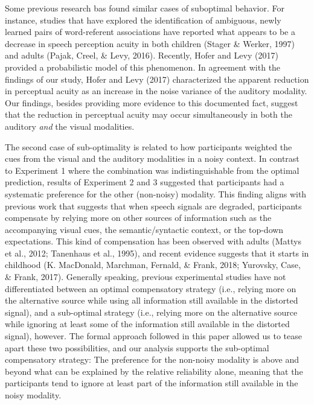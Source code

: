 \documentclass[english,,man,floatsintext]{apa6}
\theoremstyle{definition}
\theoremstyle{definition}
\theoremstyle{definition}
\theoremstyle{remark}
\begin{document}
Some previous research bas found similar cases of suboptimal behavior.
For instance, studies that have explored the identification of
ambiguous, newly learned pairs of word-referent associations have
reported what appears to be a decrease in speech perception acuity in
both children (Stager \& Werker, 1997) and adults (Pajak, Creel, \&
Levy, 2016). Recently, Hofer and Levy (2017) provided a probabilistic
model of this phenomenon. In agreement with the findings of our study,
Hofer and Levy (2017) characterized the apparent reduction in perceptual
acuity as an increase in the noise variance of the auditory modality.
Our findings, besides providing more evidence to this documented fact,
suggest that the reduction in perceptual acuity may occur simultaneously
in both the auditory \emph{and} the visual modalities.

The second case of sub-optimality is related to how participants
weighted the cues from the visual and the auditory modalities in a noisy
context. In contrast to Experiment 1 where the combination was
indistinguishable from the optimal prediction, results of Experiment 2
and 3 suggested that participants had a systematic preference for the
other (non-noisy) modality. This finding aligns with previous work that
suggests that when speech signals are degraded, participants compensate
by relying more on other sources of information such as the accompanying
visual cues, the semantic/syntactic context, or the top-down
expectations. This kind of compensation has been observed with adults
(Mattys et al., 2012; Tanenhaus et al., 1995), and recent evidence
suggests that it starts in childhood (K. MacDonald, Marchman, Fernald,
\& Frank, 2018; Yurovsky, Case, \& Frank, 2017). Generally speaking,
previous experimental studies have not differentiated between an optimal
compensatory strategy (i.e., relying more on the alternative source
while using all information still available in the distorted signal),
and a sub-optimal strategy (i.e., relying more on the alternative source
while ignoring at least some of the information still available in the
distorted signal), however. The formal approach followed in this paper
allowed us to tease apart these two possibilities, and our analysis
supports the sub-optimal compensatory strategy: The preference for the
non-noisy modality is above and beyond what can be explained by the
relative reliability alone, meaning that the participants tend to ignore
at least part of the information still available in the noisy modality.
\end{document}

